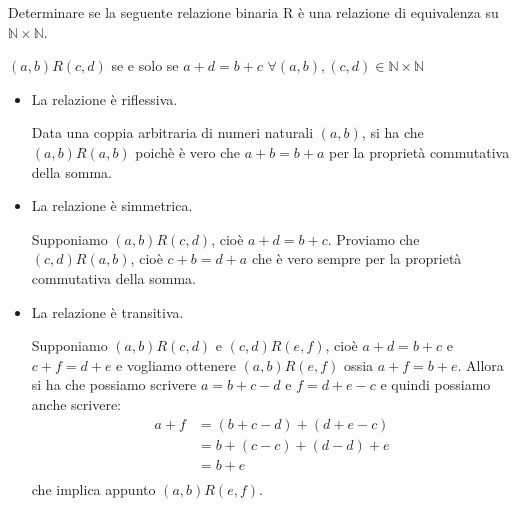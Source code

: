 


\begin{esercizio}
    Determinare se la seguente relazione binaria R è una relazione di equivalenza su $\mathbb{N} \times \mathbb{N}$.
	
	\begin{center}
		$(a,b) R (c,d)$ se e solo se $a+d = b+c$ \qquad $\forall (a,b),(c,d) \in \mathbb{N} \times \mathbb{N}$
	\end{center}
\end{esercizio}

\begin{soluzione}
    	\begin{itemize}\setlength\itemsep{1em}
		\item La relazione è riflessiva.
		
		Data una coppia arbitraria di numeri naturali $(a,b)$, si ha che $(a,b)R(a,b)$ poichè è vero che $a+b = b+a$ per la proprietà commutativa della somma. 
		
		\item La relazione è simmetrica.
		
		Supponiamo $(a,b) R (c,d)$, cioè $a+d = b+c$. Proviamo che $(c,d)R(a,b)$, cioè $c+b = d+a$ che è vero sempre per la proprietà commutativa della somma.
		
		\item La relazione è transitiva. 
		
		Supponiamo $(a,b) R (c,d)$ e $(c,d)R(e,f)$, cioè $a+d = b+c$ e $c+f = d+e$ e vogliamo ottenere $(a,b)R(e,f)$ ossia $a+f=b+e$. Allora si ha che possiamo scrivere $a=b+c-d$ e $f=d+e-c$ e quindi possiamo anche scrivere: 
		\begin{align*}
			a+f &= (b+c-d)+(d+e-c)\\
			      &= b+(c-c)+(d-d)+e\\
			      &= b+e\\
		\end{align*}
		che implica appunto $(a,b)R(e,f).$
	\end{itemize}

\end{soluzione}




